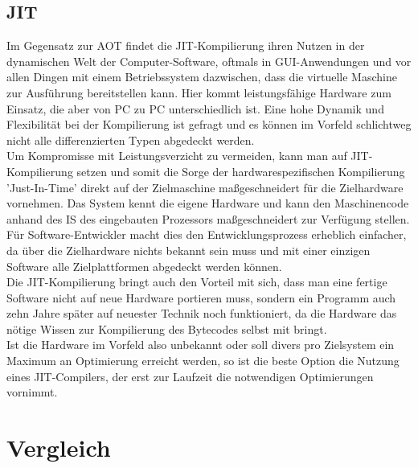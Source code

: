 \subsection{JIT}
Im Gegensatz zur \ac{AOT} findet die \ac{JIT}-Kompilierung ihren Nutzen in der dynamischen Welt der Computer-Software, oftmals in \ac{GUI}-Anwendungen und vor allen Dingen mit einem Betriebssystem dazwischen, dass die virtuelle Maschine zur Ausführung bereitstellen kann. Hier kommt leistungsfähige Hardware zum Einsatz, die aber von PC zu PC unterschiedlich ist. Eine hohe Dynamik und Flexibilität bei der Kompilierung ist gefragt und es können im Vorfeld schlichtweg nicht alle differenzierten Typen abgedeckt werden. \\
Um Kompromisse mit Leistungsverzicht zu vermeiden, kann man auf \ac{JIT}-Kompilierung setzen und somit die Sorge der hardwarespezifischen Kompilierung 'Just-In-Time' direkt auf der Zielmaschine maßgeschneidert für die Zielhardware vornehmen. Das System kennt die eigene Hardware und kann den Maschinencode anhand des \ac{IS} des eingebauten Prozessors maßgeschneidert zur Verfügung stellen. Für Software-Entwickler macht dies den Entwicklungsprozess erheblich einfacher, da über die Zielhardware nichts bekannt sein muss und mit einer einzigen Software alle Zielplattformen abgedeckt werden können. \\
Die \ac{JIT}-Kompilierung bringt auch den Vorteil mit sich, dass man eine fertige Software nicht auf neue Hardware portieren muss, sondern ein Programm auch zehn Jahre später auf neuester Technik noch funktioniert, da die Hardware das nötige Wissen zur Kompilierung des Bytecodes selbst mit bringt.\\
Ist die Hardware im Vorfeld also unbekannt oder soll divers pro Zielsystem ein Maximum an Optimierung erreicht werden, so ist die beste Option die Nutzung eines \ac{JIT}-Compilers, der erst zur Laufzeit die notwendigen Optimierungen vornimmt. 

\section{Vergleich}

